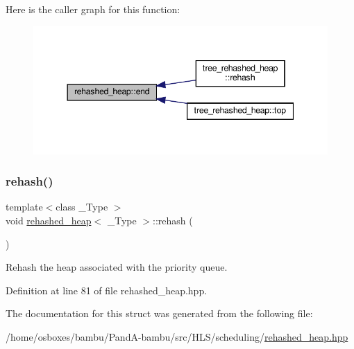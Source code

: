 Here is the caller graph for this function\+:
\nopagebreak
\begin{figure}[H]
\begin{center}
\leavevmode
\includegraphics[width=344pt]{d8/d55/structrehashed__heap_a2f8bb7618d597af59dfcce52cd7223d4_icgraph}
\end{center}
\end{figure}
\mbox{\label{structrehashed__heap_a43e3519a4d0034bb0e46807f3b6fa2d2}} 
\subsubsection{\texorpdfstring{rehash()}{rehash()}}
{\footnotesize\ttfamily template$<$class \+\_\+\+Type $>$ \\
void \hyperlink{structrehashed__heap}{rehashed\+\_\+heap}$<$ \+\_\+\+Type $>$\+::rehash (\begin{DoxyParamCaption}{ }\end{DoxyParamCaption})\hspace{0.3cm}{\ttfamily [inline]}}



Rehash the heap associated with the priority queue. 



Definition at line 81 of file rehashed\+\_\+heap.\+hpp.



The documentation for this struct was generated from the following file\+:\begin{DoxyCompactItemize}
\item 
/home/osboxes/bambu/\+Pand\+A-\/bambu/src/\+H\+L\+S/scheduling/\hyperlink{rehashed__heap_8hpp}{rehashed\+\_\+heap.\+hpp}\end{DoxyCompactItemize}
